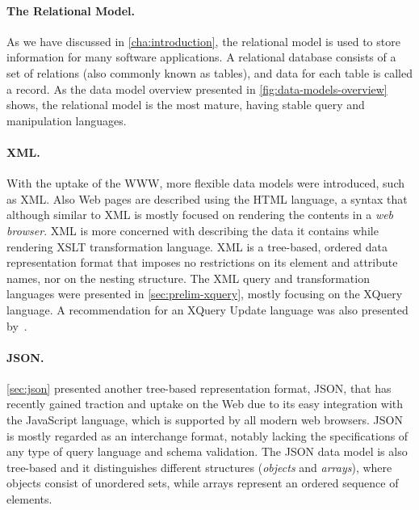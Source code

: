 \paragraph*{The Relational Model.}
%
As we have discussed in \cref{cha:introduction}, the relational model is used to store information for many
software applications.  A relational database consists of a set of relations (also commonly known as tables), and data
for each table is called a record.
%
As the data model overview presented in \cref{fig:data-models-overview} shows, the relational model is the most
mature, having stable query and manipulation languages.
%

\paragraph*{XML.}
With the uptake of the \ac{WWW}, more flexible data models were introduced, such as \ac{XML}.
%
Also Web pages are described using the \ac{HTML} language, a syntax that although similar to \ac{XML} is mostly focused
on rendering the contents in a \emph{web browser}.
%
\ac{XML} is more concerned with describing the data it contains while rendering \acs{XSLT} transformation language.
% 
\ac{XML} is a tree-based, ordered data representation format that imposes no restrictions on its element and attribute
names, nor on the nesting structure.
%
The \ac{XML} query and transformation languages were presented in \cref{sec:prelim-xquery}, mostly focusing on the
XQuery language.  A recommendation for an XQuery Update language was also presented
by~\citet{RobieChamberlinDyck:2011aa}.

\paragraph*{JSON.}
%
\cref{sec:json} presented another tree-based representation format, \ac{JSON}, that has recently gained traction and
uptake on the Web due to its easy integration with the JavaScript language, which is supported by all modern web
browsers.
%
\acs{JSON} is mostly regarded as an interchange format, notably lacking the specifications of any type of query language
and schema validation.  The \ac{JSON} data model is also tree-based and it distinguishes different structures
(\emph{objects} and \emph{arrays}), where objects consist of unordered sets, while arrays represent an ordered sequence
of elements.


